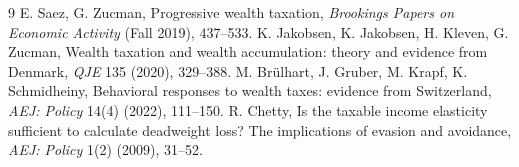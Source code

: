 \documentclass[11pt]{article}
\theoremstyle{definition}
\begin{document}
\begin{thebibliography}{9}
 E. Saez, G. Zucman, Progressive wealth taxation, \emph{Brookings Papers on Economic Activity} (Fall 2019), 437--533.
 K. Jakobsen, K. Jakobsen, H. Kleven, G. Zucman, Wealth taxation and wealth accumulation: theory and evidence from Denmark, \emph{QJE} 135 (2020), 329--388.
 M. Br\"ulhart, J. Gruber, M. Krapf, K. Schmidheiny, Behavioral responses to wealth taxes: evidence from Switzerland, \emph{AEJ: Policy} 14(4) (2022), 111--150.
 R. Chetty, Is the taxable income elasticity sufficient to calculate deadweight loss? The implications of evasion and avoidance, \emph{AEJ: Policy} 1(2) (2009), 31--52.
\end{thebibliography}
\end{document}
